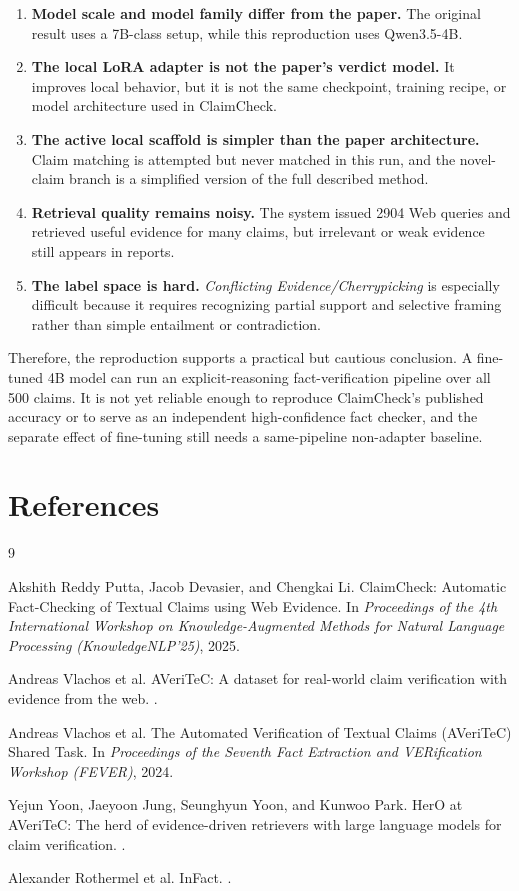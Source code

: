 \documentclass[11pt]{article}
\begin{document}
\begin{enumerate}
\item \textbf{Model scale and model family differ from the paper.} The original result uses a 7B-class setup, while this reproduction uses Qwen3.5-4B.
\item \textbf{The local LoRA adapter is not the paper's verdict model.} It improves local behavior, but it is not the same checkpoint, training recipe, or model architecture used in ClaimCheck.
\item \textbf{The active local scaffold is simpler than the paper architecture.} Claim matching is attempted but never matched in this run, and the novel-claim branch is a simplified version of the full described method.
\item \textbf{Retrieval quality remains noisy.} The system issued 2904 Web queries and retrieved useful evidence for many claims, but irrelevant or weak evidence still appears in reports.
\item \textbf{The label space is hard.} \textit{Conflicting Evidence/Cherrypicking} is especially difficult because it requires recognizing partial support and selective framing rather than simple entailment or contradiction.
\end{enumerate}

Therefore, the reproduction supports a practical but cautious conclusion. A fine-tuned 4B model can run an explicit-reasoning fact-verification pipeline over all 500 claims. It is not yet reliable enough to reproduce ClaimCheck's published accuracy or to serve as an independent high-confidence fact checker, and the separate effect of fine-tuning still needs a same-pipeline non-adapter baseline.

\section*{References}
\begin{thebibliography}{9}

Akshith Reddy Putta, Jacob Devasier, and Chengkai Li.
\newblock ClaimCheck: Automatic Fact-Checking of Textual Claims using Web Evidence.
\newblock In \textit{Proceedings of the 4th International Workshop on Knowledge-Augmented Methods for Natural Language Processing (KnowledgeNLP'25)}, 2025.

Andreas Vlachos et al.
\newblock AVeriTeC: A dataset for real-world claim verification with evidence from the web.
.

Andreas Vlachos et al.
\newblock The Automated Verification of Textual Claims (AVeriTeC) Shared Task.
\newblock In \textit{Proceedings of the Seventh Fact Extraction and VERification Workshop (FEVER)}, 2024.

Yejun Yoon, Jaeyoon Jung, Seunghyun Yoon, and Kunwoo Park.
\newblock HerO at AVeriTeC: The herd of evidence-driven retrievers with large language models for claim verification.
.

Alexander Rothermel et al.
\newblock InFact.
.

\end{thebibliography}
\end{document}
